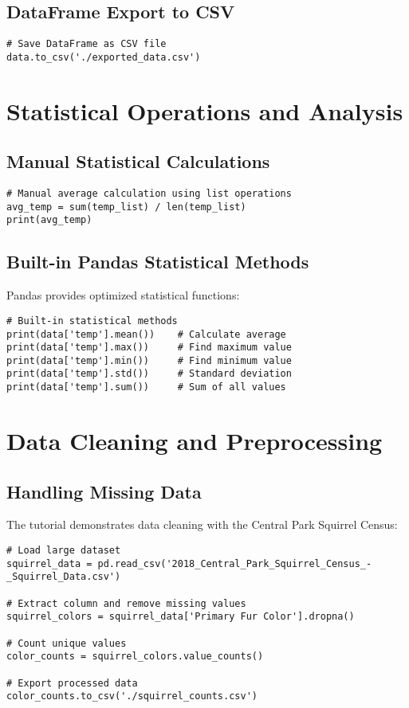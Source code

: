 \documentclass[12pt]{article}
\begin{document}
\subsection{DataFrame Export to CSV}

\begin{lstlisting}
# Save DataFrame as CSV file
data.to_csv('./exported_data.csv')
\end{lstlisting}

\section{Statistical Operations and Analysis}

\subsection{Manual Statistical Calculations}

\begin{lstlisting}
# Manual average calculation using list operations
avg_temp = sum(temp_list) / len(temp_list)
print(avg_temp)
\end{lstlisting}

\subsection{Built-in Pandas Statistical Methods}

Pandas provides optimized statistical functions:

\begin{lstlisting}
# Built-in statistical methods
print(data['temp'].mean())    # Calculate average
print(data['temp'].max())     # Find maximum value
print(data['temp'].min())     # Find minimum value
print(data['temp'].std())     # Standard deviation
print(data['temp'].sum())     # Sum of all values
\end{lstlisting}

\section{Data Cleaning and Preprocessing}

\subsection{Handling Missing Data}

The tutorial demonstrates data cleaning with the Central Park Squirrel Census:

\begin{lstlisting}
# Load large dataset
squirrel_data = pd.read_csv('2018_Central_Park_Squirrel_Census_-_Squirrel_Data.csv')

# Extract column and remove missing values
squirrel_colors = squirrel_data['Primary Fur Color'].dropna()

# Count unique values
color_counts = squirrel_colors.value_counts()

# Export processed data
color_counts.to_csv('./squirrel_counts.csv')
\end{lstlisting}
\end{document}
